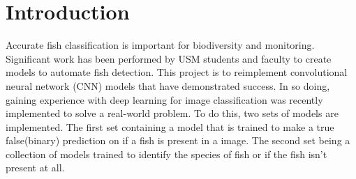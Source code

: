 \section{Introduction}

Accurate fish classification is important for biodiversity and monitoring. Significant work has been performed by USM students and faculty to create models to automate fish detection. This project is to reimplement convolutional neural network (CNN) models that have demonstrated success. In so doing, gaining experience with deep learning for image classification was recently implemented to solve a real-world problem.
To do this, two sets of models are implemented. The first set containing a model that is trained to make a true false(binary) prediction on if a fish is present in a image.
The second set being a collection of models trained to identify the species of fish or if the fish isn't present at all.


